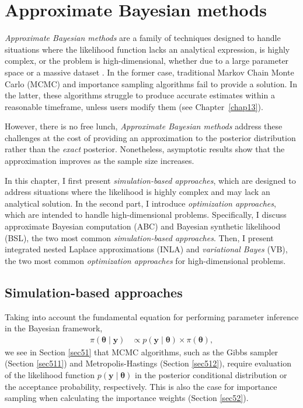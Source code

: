 \chapter{Approximate Bayesian methods}\label{chap15}

\textit{Approximate Bayesian methods} are a family of techniques designed to handle situations where the likelihood function lacks an analytical expression, is highly complex, or the problem is high-dimensional, whether due to a large parameter space or a massive dataset \cite{martin2024approximating}. In the former case, traditional Markov Chain Monte Carlo (MCMC) and importance sampling algorithms fail to provide a solution. In the latter, these algorithms struggle to produce accurate estimates within a reasonable timeframe, unless users modify them (see Chapter~\ref{chap13}).

However, there is no free lunch, \textit{Approximate Bayesian methods} address these challenges at the cost of providing an approximation to the posterior distribution rather than the \textit{exact} posterior. Nonetheless, asymptotic results show that the approximation improves as the sample size increases.

In this chapter, I first present \textit{simulation-based approaches}, which are designed to address situations where the likelihood is highly complex and may lack an analytical solution. In the second part, I introduce \textit{optimization approaches}, which are intended to handle high-dimensional problems. Specifically, I discuss approximate Bayesian computation (ABC) and Bayesian synthetic likelihood (BSL), the two most common \textit{simulation-based approaches}. Then, I present integrated nested Laplace approximations (INLA) and \textit{variational Bayes} (VB), the two most common \textit{optimization approaches} for high-dimensional problems.

\section{Simulation-based approaches}\label{sec15_1}
Taking into account the fundamental equation for performing parameter inference in the Bayesian framework,  
\begin{align*}
	\pi(\boldsymbol{\theta} \mid \mathbf{y}) & \propto p(\mathbf{y} \mid \boldsymbol{\theta}) \times \pi(\boldsymbol{\theta}),
\end{align*}  
we see in Section \ref{sec51} that MCMC algorithms, such as the Gibbs sampler (Section \ref{sec511}) and Metropolis-Hastings (Section \ref{sec512}), require evaluation of the likelihood function \( p(\boldsymbol{y} \mid \boldsymbol{\theta}) \) in the posterior conditional distribution or the acceptance probability, respectively. This is also the case for importance sampling when calculating the importance weights (Section \ref{sec52}).  

